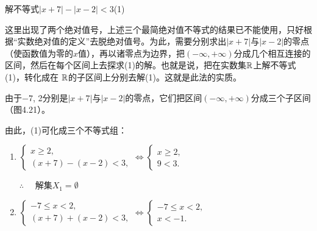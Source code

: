 \begin{example}
    解不等式$|x+7|-|x-2|<3$\hfill (1)
\end{example}

\begin{analyze}
这里出现了两个绝对值号，上述三个最简绝对值不等式的结果已不能使用，只好根据“实数绝对值的定义”去脱绝对值号。为此，需要分别求出$|x+7|$与$|x-2|$的零点（使函数值为零的$x$值），再以诸零点为边界，把$(-\infty,+\infty)$分成几个相互连接的区间，然后在每个区间上去探求(1)的解。也就是说，把在实数集$\mathbb{R}$上解不等式(1)，转化成在
$\mathbb{R}$的子区间上分别去解(1)。这就是此法的实质。

\end{analyze}

\begin{solution}
    由于$-7$, 2分别是$|x+7|$与$|x-2|$的零点，它们把区间$(-\infty,+\infty)$分成三个子区间（图4.21）。

\begin{figure}[htp]
    \centering
{}
    \caption{}
\end{figure}

由此，(1)可化成三个不等式组：
\begin{enumerate}[(1)]
    \item $\begin{cases}x\geqslant2,\\(x+7)-(x-2)<3,\end{cases}\Longleftrightarrow\begin{cases}x\geqslant2,\\9<3.\end{cases}$
    
    $\therefore\quad$ 解集$X_1=\emptyset$

    \item $\begin{cases} - 7\leq x< 2, \\ ( x+ 7) + ( x- 2) < 3, \end{cases} \Longleftrightarrow \begin{cases} - 7\leq x< 2, \\ x< - 1.  \end{cases}$
    

\end{enumerate}
\end{solution}

